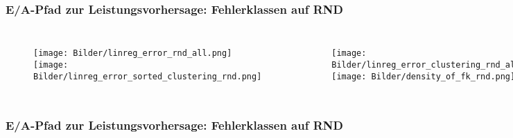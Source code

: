 \documentclass{beamer}
\begin{document}
\begin{frame}
\frametitle{E/A-Pfad zur Leistungsvorhersage: Fehlerklassen auf RND}
\begin{columns}
	\begin{figure}
		\texttt{[image: Bilder/linreg\_error\_rnd\_all.png]}\\
		\texttt{[image: Bilder/linreg\_error\_sorted\_clustering\_rnd.png]}
	\end{figure}
	\begin{figure}
		\texttt{[image: Bilder/linreg\_error\_clustering\_rnd\_all.png]}\\
		\texttt{[image: Bilder/density\_of\_fk\_rnd.png]}
	\end{figure}
\end{columns}
\end{frame}

\begin{frame}
\frametitle{E/A-Pfad zur Leistungsvorhersage: Fehlerklassen auf RND}
\begin{table}
\end{table}
\end{frame}
\end{document}
